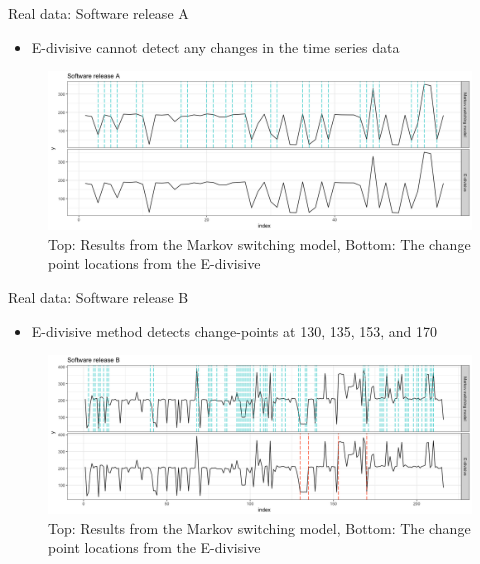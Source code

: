 \documentclass{beamer}
\begin{document}
\begin{frame}
Real data: Software release A

\begin{itemize}
\item E-divisive cannot detect any changes in the time series data
\end{itemize}

\begin{figure}
\includegraphics[width=1\linewidth]{compare_L16A}
\caption{Top: Results from the Markov switching model, Bottom: The change point locations from the E-divisive}
\end{figure}

\end{frame}
\begin{frame}
Real data: Software release B

\begin{itemize}
\item E-divisive method detects change-points at 130, 135, 153, and 170
\end{itemize}

\begin{figure}
\includegraphics[width=1\linewidth]{compare_L16B}
\caption{Top: Results from the Markov switching model, Bottom: The change point locations from the E-divisive}
\end{figure}

\end{frame}
\end{document}
